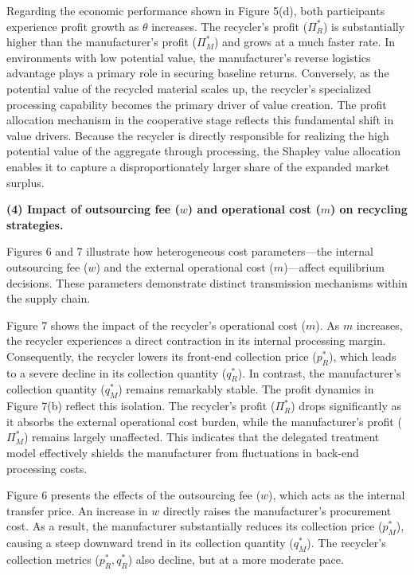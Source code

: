 \documentclass[authoryear,preprint,review,times,10pt]{elsarticle}
\begin{document}
Regarding the economic performance shown in Figure 5(d), both participants experience profit growth as $\theta$ increases. The recycler's profit ($\Pi_R^*$) is substantially higher than the manufacturer's profit ($\Pi_M^*$) and grows at a much faster rate. In environments with low potential value, the manufacturer's reverse logistics advantage plays a primary role in securing baseline returns. Conversely, as the potential value of the recycled material scales up, the recycler's specialized processing capability becomes the primary driver of value creation. The profit allocation mechanism in the cooperative stage reflects this fundamental shift in value drivers. Because the recycler is directly responsible for realizing the high potential value of the aggregate through processing, the Shapley value allocation enables it to capture a disproportionately larger share of the expanded market surplus.


\noindent\textbf{(4) Impact of outsourcing fee ($w$) and operational cost ($m$) on recycling strategies.}

Figures 6 and 7 illustrate how heterogeneous cost parameters—the internal outsourcing fee ($w$) and the external operational cost ($m$)—affect equilibrium decisions. These parameters demonstrate distinct transmission mechanisms within the supply chain.

Figure 7 shows the impact of the recycler's operational cost ($m$). As $m$ increases, the recycler experiences a direct contraction in its internal processing margin. Consequently, the recycler lowers its front-end collection price ($p_R^*$), which leads to a severe decline in its collection quantity ($q_R^*$). In contrast, the manufacturer's collection quantity ($q_M^*$) remains remarkably stable. The profit dynamics in Figure 7(b) reflect this isolation. The recycler's profit ($\Pi_R^*$) drops significantly as it absorbs the external operational cost burden, while the manufacturer's profit ($\Pi_M^*$) remains largely unaffected. This indicates that the delegated treatment model effectively shields the manufacturer from fluctuations in back-end processing costs.

Figure 6 presents the effects of the outsourcing fee ($w$), which acts as the internal transfer price. An increase in $w$ directly raises the manufacturer's procurement cost. As a result, the manufacturer substantially reduces its collection price ($p_M^*$), causing a steep downward trend in its collection quantity ($q_M^*$). The recycler's collection metrics ($p_R^*, q_R^*$) also decline, but at a more moderate pace.
\end{document}

